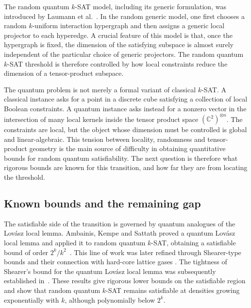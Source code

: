 \documentclass[11pt]{article}
\begin{document}
The random quantum \(k\)-SAT model, including its generic formulation, was
introduced by Laumann et al.~\cite{LMS10,LLMSS10}.  In the random generic
model, one first chooses a random \(k\)-uniform interaction hypergraph and then
assigns a generic local projector to each hyperedge.  A crucial feature of this
model is that, once the hypergraph is fixed, the dimension of the satisfying
subspace is almost surely independent of the particular choice of generic
projectors.  The random quantum \(k\)-SAT threshold is therefore controlled by
how local constraints reduce the dimension of a tensor-product subspace.

The quantum problem is not merely a formal variant of classical \(k\)-SAT.  A
classical instance asks for a point in a discrete cube satisfying a collection
of local Boolean constraints.  A quantum instance asks instead for a nonzero
vector in the intersection of many local kernels inside the tensor product
space \((\mathbb C^2)^{\otimes n}\).  The constraints are local, but the object
whose dimension must be controlled is global and linear-algebraic.  This
tension between locality, randomness and tensor-product geometry is the main
source of difficulty in obtaining quantitative bounds for random quantum
satisfiability.  The next question is therefore what rigorous bounds are known
for this transition, and how far they are from locating the threshold.

\subsection{Known bounds and the remaining gap}
\label{subsec:known-bounds}

The satisfiable side of the transition is governed by quantum analogues of the
Lov\'asz local lemma.  Ambainis, Kempe and Sattath proved a quantum Lov\'asz
local lemma and applied it to random quantum \(k\)-SAT, obtaining a satisfiable
bound of order \(2^k/k^2\)~\cite{AKS}.  This line of work was later refined
through Shearer-type bounds and their connection with hard-core lattice gases
\cite{SMLM16}.  The tightness of Shearer's bound for the quantum Lov\'asz local
lemma was subsequently established in~\cite{HLSZ19}.  These results give
rigorous lower bounds on the satisfiable region and show that random quantum
\(k\)-SAT remains satisfiable at densities growing exponentially with \(k\),
although polynomially below \(2^k\).
\end{document}
